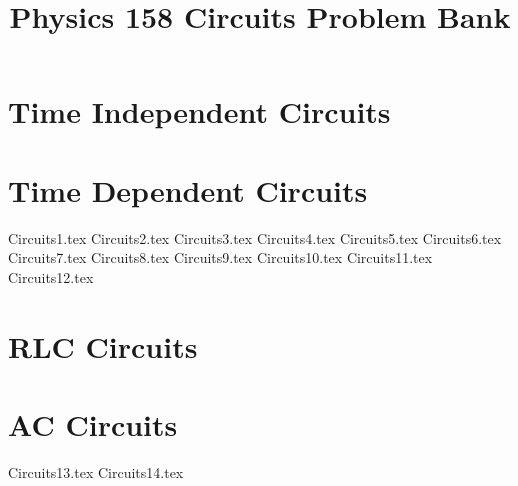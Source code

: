 \documentclass[11pt, fleqn]{article}
\title{Physics 158 Circuits Problem Bank}
\author{}
\date{}
\begin{document}
\allowdisplaybreaks

\maketitle

\section*{Time Independent Circuits}

\section*{Time Dependent Circuits}
{Circuits1.tex}
{Circuits2.tex}
{Circuits3.tex}
{Circuits4.tex}
{Circuits5.tex}
{Circuits6.tex}
{Circuits7.tex} %
{Circuits8.tex} %
{Circuits9.tex} %
{Circuits10.tex} %
{Circuits11.tex} %
{Circuits12.tex} %

\section*{RLC Circuits}

\section*{AC Circuits}
{Circuits13.tex}
{Circuits14.tex}
\end{document}

